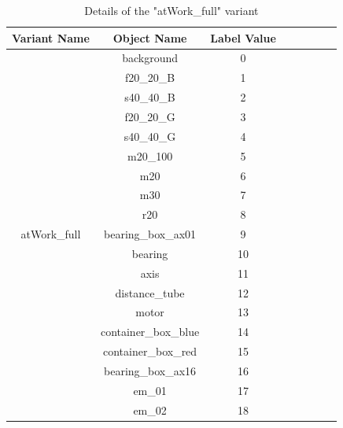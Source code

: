 \begin{itemize}
		\begin{table}[!htb]
			\centering
			\begin{tabular}{|c|c|c|c|c|c|c|c|}
			\hline 
  			\textbf{Variant Name} & \textbf{Object Name} & \textbf{Label Value} \\ 
			\hline
			\multirow{19}{*}{atWork\_full} & background & 0 \\ 
			\cline{2-3}%
			 & f20\_20\_B & 1 \\ 
			\cline{2-3} 
			& s40\_40\_B & 2 \\
			\cline{2-3} 
			& f20\_20\_G & 3 \\
			\cline{2-3} 
			& s40\_40\_G & 4 \\
			\cline{2-3} 
			& m20\_100 & 5 \\
			\cline{2-3} 
			& m20 & 6 \\
			\cline{2-3} 
			& m30 & 7 \\
			\cline{2-3} 
			& r20 & 8 \\
			\cline{2-3} 
			& bearing\_box\_ax01 & 9 \\
			\cline{2-3} 
			& bearing & 10 \\
			\cline{2-3} 
			& axis & 11 \\
			\cline{2-3} 
			& distance\_tube & 12 \\
			\cline{2-3} 
			& motor & 13 \\
			\cline{2-3} 
			& container\_box\_blue & 14 \\
			\cline{2-3} 
			& container\_box\_red & 15 \\
			\cline{2-3} 
			& bearing\_box\_ax16 & 16 \\
			\cline{2-3} 
			& em\_01 & 17 \\
			\cline{2-3} 
			& em\_02 & 18 \\
			\hline
			\end{tabular}
			\caption{Details of the "atWork\_full" variant} 
			\label{Table:full}
		\end{table}
		

\end{itemize}
